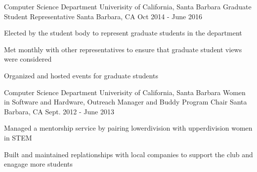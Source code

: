 \begin{cventries}
\cventry
    {Computer Science Department \newline Univerisity of California, Santa Barbara}
    {Graduate Student Representative}
    {Santa Barbara, CA}
    {Oct 2014 - June 2016}
    {
      \begin{cvitems}
	\item{Elected by the student body to represent graduate students in the department}
        \item {Met monthly with other representatives to ensure that graduate student views were considered}
        \item {Organized and hosted events for graduate students}
      \end{cvitems}
    }

\cventry
    {Computer Science Department \newline Univerisity of California, Santa Barbara}
    {Women in Software and Hardware, Outreach Manager and Buddy Program Chair}
    {Santa Barbara, CA}
    {Sept. 2012 - June 2013}
    {
      \begin{cvitems}
	\item{Managed a mentorship service by pairing lowerdivision with upperdivision women in STEM}
        \item {Built and maintained replationships with local companies to support the club and enagage more students}
      \end{cvitems}
    }
  \end{cventries}
